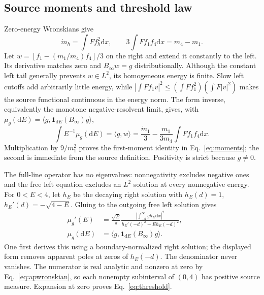 \documentclass[aps,pra,reprint,superscriptaddress,longbibliography]{revtex4-2}
\newcommand{\dd}{\mathrm d}
\newcommand{\ip}[2]{\langle#1,#2\rangle}
\newcommand{\one}{\mathbf 1}
\begin{document}
\subsection{Source moments and threshold law}

Zero-energy Wronskians give
\begin{equation}
 \dot m_h=\int Ff_h^2\dd x,\qquad
 3\int Ff_1f_4\dd x=m_4-m_1.                            \label{eq:apwronskian}
\end{equation}
Let $w=[f_1-(m_1/m_4)f_4]/3$ on the right and extend it constantly
to the left. Its derivative matches zero and $B_\infty w=g$
distributionally. Although the constant left tail generally prevents
$w\in L^2$, its homogeneous energy is finite. Slow left cutoffs add
arbitrarily little energy, while
$|\int Ff_1v|^2\le(\int Ff_1^2)(\int F|v|^2)$ makes the source
functional continuous in the energy norm. The form inverse, equivalently
the monotone negative-resolvent limit, gives, with
$\mu_g(\dd E)=\ip{g}{\one_{\dd E}(B_\infty)g}$,
\begin{equation}
 \int E^{-1}\mu_g(\dd E)
 =\ip{g}{w}
 =\frac{\dot m_1}{3}-\frac{m_1}{3m_4}\int Ff_1f_4\dd x. \label{eq:apform}
\end{equation}
Multiplication by $9/m_1^2$ proves the first-moment identity
in Eq.~\eqref{eq:moments}; the second is immediate from the source
definition. Positivity is strict because $g\ne0$.

The full-line operator has no eigenvalues: nonnegativity excludes
negative ones and the free left equation excludes an $L^2$ solution
at every nonnegative energy. For $0<E<4$, let $h_E$ be the decaying
right solution with $h_E(d)=1$, $h_E'(d)=-\sqrt{4-E}$. Gluing to the
outgoing free left solution gives
\begin{equation}
 \begin{aligned}
 \mu_g'(E)&=\frac{\sqrt E}{\pi}
 \frac{|\int_{-d}^{\infty}g h_E\dd x|^2}
      {h_E'(-d)^2+E h_E(-d)^2},\qquad\\
 \mu_g(\dd E)&=\ip{g}{\one_{\dd E}(B_\infty)g}.
 \end{aligned}                                          \label{eq:apdensity}
\end{equation}
One first derives this using a boundary-normalized right solution;
the displayed form removes apparent poles at zeros of $h_E(-d)$.
The denominator never vanishes. The numerator is real analytic and
nonzero at zero by Eq.~\eqref{eq:apwronskian}, so each nonempty
subinterval of $(0,4)$ has positive source measure. Expansion at zero
proves Eq.~\eqref{eq:threshold}.
\end{document}
